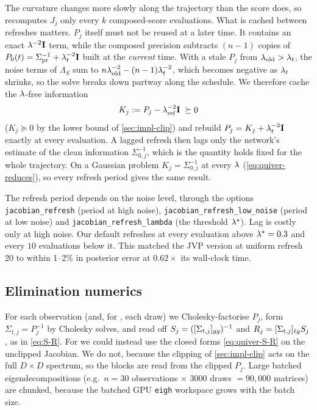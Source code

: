 The curvature changes more slowly along the trajectory than the score does, so \quiver{} recomputes $J_j$ only every $k$ composed-score evaluations.
What is cached between refreshes matters.
$P_j$ itself must not be reused at a later time.
It contains an exact $\lambda^{-2}\mathbf{I}$ term, while the composed precision subtracts $(n-1)$ copies of $P_{0}(t)=\Sigma_\mathrm{pr}^{-1}+\lambda_t^{-2}\mathbf{I}$ built at the \emph{current} time.
With a stale $P_j$ from $\lambda_\mathrm{old}>\lambda_t$, the noise terms of $\Lambda_S$ sum to $n\lambda_\mathrm{old}^{-2}-(n-1)\lambda_t^{-2}$, which becomes negative as $\lambda_t$ shrinks, so the solve breaks down partway along the schedule.
We therefore cache the $\lambda$-free information
\begin{equation}\label{eq:lambda-free}
  K_j:=P_j-\lambda_\mathrm{ref}^{-2}\mathbf{I}\;\succeq0
\end{equation}
($K_j\succeq0$ by the lower bound of \cref{sec:impl-clip}) and rebuild $P_j=K_j+\lambda_t^{-2}\mathbf{I}$ exactly at every evaluation.
A lagged refresh then lags only the network's estimate of the clean information $\Sigma_{0,j}^{-1}$, which is the quantity \arrowm{} holds fixed for the whole trajectory.
On a Gaussian problem $K_j=\Sigma_{0,j}^{-1}$ at every $\lambda$ (\cref{eq:quiver-reduces}), so every refresh period gives the same result.

The refresh period depends on the noise level, through the options \texttt{jacobian\_refresh} (period at high noise), \texttt{jacobian\_refresh\_low\_noise} (period at low noise) and \texttt{jacobian\_refresh\_lambda} (the threshold $\lambda^\star$).
Lag is costly only at high noise.
Our default refreshes at every evaluation above $\lambda^\star=0.3$ and every $10$ evaluations below it.
This matched the JVP version at uniform refresh 20 to within 1--2\% in posterior error at $0.62\times$ its wall-clock time.

\subsection{Elimination numerics}\label{sec:impl-elimination}

For each observation (and, for \quiver, each draw) we Cholesky-factorise $P_j$, form $\Sigma_{t,j}=P_j^{-1}$ by Cholesky solves, and read off
$S_j=([\Sigma_{t,j}]_{gg})^{-1}$ and $R_j=[\Sigma_{t,j}]_{\ell g}S_j$, as in \cref{eq:S-R}.
For \quiver{} we could instead use the closed forms \cref{eq:quiver-S-R} on the unclipped Jacobian.
We do not, because the clipping of \cref{sec:impl-clip} acts on the full $D\times D$ spectrum, so the blocks are read from the clipped $P_j$.
Large batched eigendecompositions (e.g.\ $n=30$ observations $\times$ $3000$ draws $=90{,}000$ matrices) are chunked, because the batched GPU \texttt{eigh} workspace grows with the batch size.

